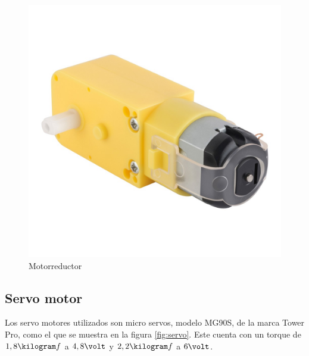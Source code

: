 \documentclass[12pt,letterpaper]{article}     %
\begin{document}
\begin{figure}[!ht]
\centering
\includegraphics[scale=0.25]{imagenes/motorreductor.jpg}
\caption{Motorreductor}
\label{fig:motor}
\end{figure}

\subsection{Servo motor}

Los servo motores utilizados son micro servos, modelo MG90S, de la marca Tower Pro, como el que
se muestra en la figura \ref{fig:servo}. Este cuenta con un torque de $1,8\kilogram f$ a $4,8\volt$
y $2,2\kilogram f$ a $6\volt$.
\end{document}
